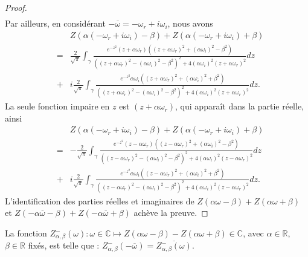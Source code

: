 \begin{proof}
\begin{eqnarray*}
\end{eqnarray*}
%
Par ailleurs, en considérant $-\overline{\omega}=-\omega_r+i\omega_i$, nous avons
%
\begin{eqnarray*}
&&Z(\alpha(-\omega_r+i\omega_i)-\beta)+Z(\alpha(-\omega_r+i\omega_i)+\beta)\\
&=&\frac{2}{\sqrt{\pi}}\int_\gamma\frac{e^{-z^2}(z+\alpha\omega_r)\left((z+\alpha\omega_r)^2+(\alpha\omega_i)^2-\beta^2\right)}{\left((z+\alpha\omega_r)^2-(\alpha\omega_i)^2-\beta^2\right)^2+4\left(\alpha\omega_i\right)^2(z+\alpha\omega_r)^2}dz\\
&+&i\frac{2}{\sqrt{\pi}}\int_\gamma\frac{e^{-z^2}\alpha\omega_i\left((z+\alpha\omega_r)^2+(\alpha\omega_i)^2+\beta^2\right)}{\left((z+\alpha\omega_r)^2-(\alpha\omega_i)^2-\beta^2\right)^2+4\left(\alpha\omega_i\right)^2(z+\alpha\omega_r)^2}dz.
\end{eqnarray*}
La seule fonction impaire en $z$ est $(z+\alpha\omega_r)$, qui apparaît dans la partie réelle, ainsi
\begin{eqnarray*}
&&Z(\alpha(-\omega_r+i\omega_i)-\beta)+Z(\alpha(-\omega_r+i\omega_i)+\beta)\\
&=&-\frac{2}{\sqrt{\pi}}\int_\gamma\frac{e^{-z^2}(z-\alpha\omega_r)\left((z-\alpha\omega_r)^2+(\alpha\omega_i)^2-\beta^2\right)}{\left((z-\alpha\omega_r)^2-(\alpha\omega_i)^2-\beta^2\right)^2+4\left(\alpha\omega_i\right)^2(z-\alpha\omega_r)^2}dz\\
&+&i\frac{2}{\sqrt{\pi}}\int_\gamma\frac{e^{-z^2}\alpha\omega_i\left((z-\alpha\omega_r)^2+(\alpha\omega_i)^2+\beta^2\right)}{\left((z-\alpha\omega_r)^2-(\alpha\omega_i)^2-\beta^2\right)^2+4\left(\alpha\omega_i\right)^2(z-\alpha\omega_r)^2}dz.
\end{eqnarray*}
L'identification des parties réelles et imaginaires de $Z(\alpha\omega-\beta)+Z(\alpha\omega+\beta)$ et $Z(-\alpha\overline{\omega}-\beta)+Z(-\alpha\overline{\omega}+\beta)$ achève la preuve.
\end{proof}


\begin{lemma}
  La fonction $Z_{\alpha,\beta}^-(\omega):\omega\in\mathbb{C}\mapsto Z\left(\alpha\omega-\beta\right)-Z\left(\alpha\omega+\beta\right)\in\mathbb{C}$, avec $\alpha\in\mathbb{R}$, $\beta\in\mathbb{R}$ fixés, est telle que : $Z_{\alpha,\beta}^-\left(-\overline{\omega}\right)=\overline{Z_{\alpha,\beta}^-(\omega)}$.
  \end{lemma}


